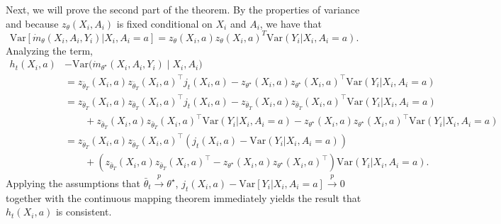 \documentclass[11pt]{article}
\newcommand{\Var}{\mathrm{Var}}
\begin{document}
\begin{appendix}
Next, we will prove the second part of the theorem. By the properties of variance and because $z_{\theta}(X_i,A_i)$ is fixed conditional on $X_i$ and $A_i$, we have that
$$ \Var\left[\dot{m}_{\theta}(X_i,A_i,Y_i) | X_{i},A_i =a\right] = z_{\theta}(X_i,a) z_{\theta}(X_i,a)^{T} \Var(Y_{i} | X_i,A_i=a).$$
Analyzing the term, 
\begin{align*}
h_t(X_i,a) &- \Var\big(\dot m_{\theta^\star}(X_i,A_i,Y_i)\mid X_i,A_i\big) \\
&= z_{\bar\theta_T}(X_i,a) z_{\bar\theta_T}(X_i,a)^\top j_{t}(X_i,a)  
        - z_{\theta^\star}(X_i,a) z_{\theta^\star}(X_i,a)^\top\Var(Y_{i} | X_i,A_i=a)  \\
&= z_{\bar\theta_T}(X_i,a) z_{\bar\theta_T}(X_i,a)^\top j_{t}(X_i,a) - z_{\bar\theta_T}(X_i,a) z_{\bar\theta_T}(X_i,a)^\top \Var(Y_{i} | X_i,A_i=a) \\
&\quad \quad +z_{\bar\theta_T}(X_i,a) z_{\bar\theta_T}(X_i,a)^\top \Var(Y_{i} | X_i,A_i=a) - z_{\theta^\star}(X_i,a) z_{\theta^\star}(X_i,a)^\top\Var(Y_{i} | X_i,A_i=a)  \\
&= z_{\bar\theta_T}(X_i,a) z_{\bar\theta_T}(X_i,a)^\top \left( j_{t}(X_i,a) - \Var(Y_{i} | X_i,A_i=a)  \right) \\
& \quad \quad +  \left(z_{\bar\theta_T}(X_i,a) z_{\bar\theta_T}(X_i,a)^\top - z_{\theta^\star}(X_i,a) z_{\theta^\star}(X_i,a)^\top \right)\Var(Y_{i} | X_i,A_i=a).
\end{align*}
Applying the assumptions that $\bar{\theta}_{t} \overset{p}{\to} \theta^{\star}$, $j_{t}(X_i,a) - \text{Var}[Y_{i}|X_i,A_i=a]\overset{p}{\to} 0$ together with the continuous mapping theorem immediately yields the result that $h_{t}(X_i,a)$ is consistent.


\end{appendix}
\end{document}
